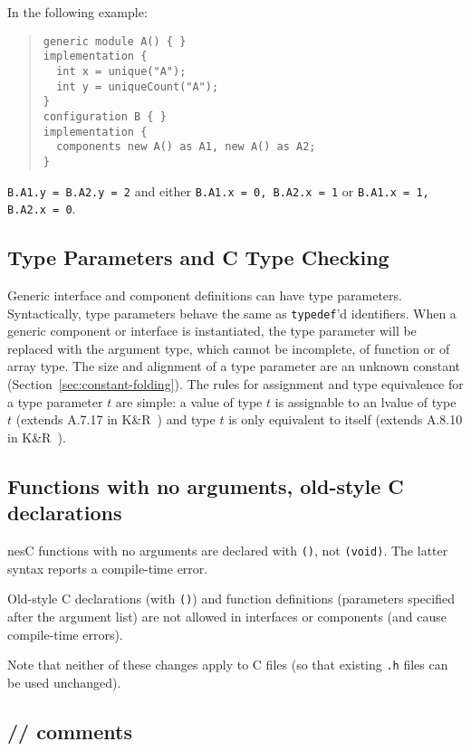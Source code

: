 \documentclass[11pt,letterpaper]{article}
\newcommand{\kw}[1]{{\tt #1}}
\newcommand{\code}[1]{{\tt #1}}
\newcommand{\file}[1]{{\tt #1}}
\newcommand{\nesc}{nesC\xspace}
\begin{document}
In the following example:
\begin{quote}
\begin{verbatim}
generic module A() { }
implementation {
  int x = unique("A");
  int y = uniqueCount("A");
}
configuration B { }
implementation {
  components new A() as A1, new A() as A2;
}
\end{verbatim}
\end{quote}
\code{B.A1.y = B.A2.y = 2} and either \code{B.A1.x = 0, B.A2.x = 1} or
\code{B.A1.x = 1, B.A2.x = 0}.

\subsection{Type Parameters and C Type Checking}
\label{sec:type-parameters}

Generic interface and component definitions can have type
parameters. Syntactically, type parameters behave the same as \kw{typedef}'d
identifiers. When a generic component or interface is instantiated, the
type parameter will be replaced with the argument type, which cannot be
incomplete, of function or of array type. The size and alignment of a type
parameter are an unknown constant (Section~\ref{sec:constant-folding}).
The rules for assignment and type equivalence for a type parameter $t$ are
simple: a value of type $t$ is assignable to an lvalue of type $t$ (extends
A.7.17 in K\&R~\cite{kandr}) and type $t$ is only equivalent to itself (extends
A.8.10 in K\&R~\cite{kandr}).

\subsection{Functions with no arguments, old-style C declarations}
\label{sec:misc-void}

\nesc functions with no arguments are declared with \code{()}, not
\code{(void)}. The latter syntax reports a compile-time error.

Old-style C declarations (with \code{()}) and function definitions 
(parameters specified after the argument list) are not allowed in
interfaces or components (and cause compile-time errors).

Note that neither of these changes apply to C files (so that existing
\file{.h} files can be used unchanged).

\subsection{// comments}
\end{document}
